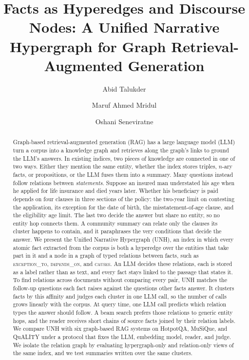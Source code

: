 \documentclass[sigconf, review, anonymous]{acmart}
\newcommand{\abid}[1]{\todo[inline, color=green!40, author=\textbf{Abid}]{#1}}
\newcommand{\sys}{UNH}
\newcommand{\sysfull}{Unified Narrative Hypergraph}
\newcommand{\rel}[1]{\textsc{#1}}            %
\begin{document}
\title{Facts as Hyperedges and Discourse Nodes: A Unified Narrative Hypergraph for Graph Retrieval-Augmented Generation}

\author{Abid Talukder}

\author{Maruf Ahmed Mridul}

\author{Oshani Seneviratne}

\renewcommand{\shortauthors}{Talukder et al.}

\begin{abstract}
Graph-based retrieval-augmented generation (RAG) has a large language model (LLM) turn a corpus into a knowledge graph and retrieves along the graph's links to ground the LLM's answers. In existing indices, two pieces of knowledge are connected in one of two ways. Either they mention the same entity, whether the index stores triples, $n$-ary facts, or propositions, or the LLM fuses them into a summary. Many questions instead follow relations between \emph{statements}. Suppose an insured man understated his age when he applied for life insurance and died years later. Whether his beneficiary is paid depends on four clauses in three sections of the policy: the two-year limit on contesting the application, its exception for the date of birth, the misstatement-of-age clause, and the eligibility age limit. The last two decide the answer but share no entity, so no entity hop connects them. A community summary can relate only the clauses its cluster happens to contain, and it paraphrases the very conditions that decide the answer. We present the \sysfull{} (\sys{}), an index in which every atomic fact extracted from the corpus is both a hyperedge over the entities that take part in it and a node in a graph of typed relations between facts, such as \rel{exception\_to}, \rel{depends\_on}, and \rel{causes}. An LLM decides these relations, each is stored as a label rather than as text, and every fact stays linked to the passage that states it. To find relations across documents without comparing every pair, \sys{} matches the follow-up questions each fact raises against the questions other facts answer. It clusters facts by this affinity and judges each cluster in one LLM call, so the number of calls grows linearly with the corpus. At query time, one LLM call predicts which relation types the answer should follow. A beam search prefers those relations to generic entity hops, and the reader receives short chains of source facts joined by their relation labels. We compare \sys{} with six graph-based RAG systems on HotpotQA, MuSiQue, and QuALITY under a protocol that fixes the LLM, embedding model, reader, and judge. We isolate the relation graph by evaluating hypergraph-only and relation-only views of the same index, and we test summaries written over the same clusters.
\abid{Add the headline result sentence once the UNH runs are scored.}
\end{abstract}
\end{document}

